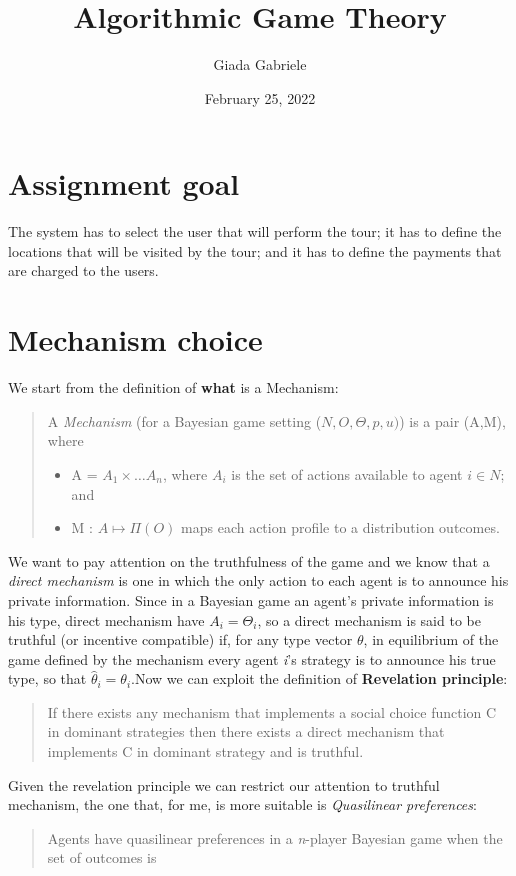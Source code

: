 \documentclass{article}
\title{Algorithmic Game Theory}
\author{Giada Gabriele}
\date{February 25, 2022}
\begin{document}
\maketitle
\section{Assignment goal}
\large{
The system has to select the user that will perform the tour; it has to define the locations that will be visited by the tour; and it has to define the payments that are charged to the users.
}
\section{Mechanism choice}
\large{
We start from the definition of \textbf{what} is a Mechanism:
\begin{quote}
    A \textit{Mechanism} (for a Bayesian game setting ($N,O,\Theta,p,u)$) is a pair (A,M), where
    \begin{itemize}
        \item A = $A_1 \times \dots A_n$, where $A_i$ is the set of actions available to agent $i \in N$; and
        \item M : $A \mapsto \Pi(O)$ maps each action profile to a distribution outcomes.
    \end{itemize}
\end{quote}
We want to pay attention on the truthfulness of the game and we know that a \textit{direct mechanism} is one in which the only action to each agent is to announce his private information. Since in a Bayesian game an agent's private information is his type, direct mechanism have $A_i = \Theta_i$, so a direct mechanism is said to be truthful (or incentive compatible) if, for any type vector $\theta$, in equilibrium of the game defined by the mechanism every agent \textit{i}'s strategy is to announce his true type, so that $\hat{\theta}_i = \theta_i$.\newpage Now we can exploit the definition of \textbf{Revelation principle}:
\begin{quote}
    If there exists any mechanism that implements a social choice function C in dominant strategies then there exists a direct mechanism that implements C in dominant strategy and is truthful.
\end{quote}
Given the revelation principle we can restrict our attention to truthful mechanism, the one that, for me, is more suitable is \textit{Quasilinear preferences}:
\begin{quote}
    Agents have quasilinear preferences in a \textit{n}-player Bayesian game when the set of outcomes is

\end{quote}}
\end{document}

